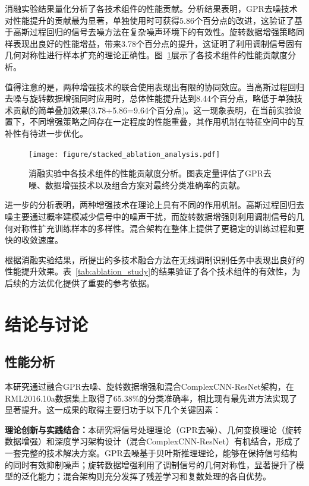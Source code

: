 \documentclass[conference]{IEEEtran}
\begin{document}
消融实验结果量化分析了各技术组件的性能贡献。分析结果表明，GPR去噪技术对性能提升的贡献最为显著，单独使用时可获得5.86个百分点的改进，这验证了基于高斯过程回归的信号去噪方法在复杂噪声环境下的有效性。旋转数据增强策略同样表现出良好的性能增益，带来3.78个百分点的提升，这证明了利用调制信号固有几何对称性进行样本扩充的理论正确性。图~\ref{fig:ablation_components}展示了各技术组件的性能贡献度分析。

值得注意的是，两种增强技术的联合使用表现出有限的协同效应。当高斯过程回归去噪与旋转数据增强同时应用时，总体性能提升达到8.44个百分点，略低于单独技术贡献的简单叠加效果(3.78+5.86=9.64个百分点)。这一现象表明，在当前实验设置下，不同增强策略之间存在一定程度的性能重叠，其作用机制在特征空间中的互补性有待进一步优化。

\begin{figure}[htbp]
\centering
\texttt{[image: figure/stacked\_ablation\_analysis.pdf]}
\caption{消融实验中各技术组件的性能贡献度分析。图表定量评估了GPR去噪、数据增强技术以及组合方案对最终分类准确率的贡献。}
\label{fig:ablation_components}
\end{figure}

进一步的分析表明，两种增强技术在理论上具有不同的作用机制。高斯过程回归去噪主要通过概率建模减少信号中的噪声干扰，而旋转数据增强则利用调制信号的几何对称性扩充训练样本的多样性。混合架构在整体上提供了更稳定的训练过程和更快的收敛速度。



根据消融实验结果，所提出的多技术融合方法在无线调制识别任务中表现出良好的性能提升效果。表~\ref{tab:ablation_study}的结果验证了各个技术组件的有效性，为后续的方法优化提供了重要的参考依据。

\section{结论与讨论}

\subsection{性能分析}

本研究通过融合GPR去噪、旋转数据增强和混合ComplexCNN-ResNet架构，在RML2016.10a数据集上取得了65.38\%的分类准确率，相比现有最先进方法实现了显著提升。这一成果的取得主要归功于以下几个关键因素：

\textbf{理论创新与实践结合：}本研究将信号处理理论（GPR去噪）、几何变换理论（旋转数据增强）和深度学习架构设计（混合ComplexCNN-ResNet）有机结合，形成了一套完整的技术解决方案。GPR去噪基于贝叶斯推理理论，能够在保持信号结构的同时有效抑制噪声；旋转数据增强利用了调制信号的几何对称性，显著提升了模型的泛化能力；混合架构则充分发挥了残差学习和复数处理的各自优势。
\end{document}

